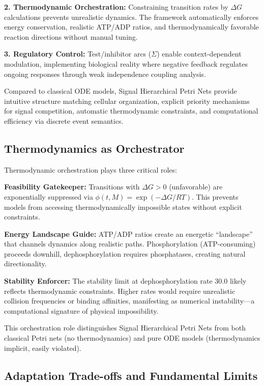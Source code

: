 \documentclass[twocolumn,11pt]{article}
\newcommand{\shpns}{Signal Hierarchical Petri Nets}
\newcommand{\dg}{\Delta G}
\begin{document}
\textbf{2. Thermodynamic Orchestration:} Constraining transition rates by $\dg{}$ calculations prevents unrealistic dynamics. The framework automatically enforces energy conservation, realistic ATP/ADP ratios, and thermodynamically favorable reaction directions without manual tuning.

\textbf{3. Regulatory Control:} Test/inhibitor arcs ($\Sigma$) enable context-dependent modulation, implementing biological reality where negative feedback regulates ongoing responses through weak independence coupling analysis.

Compared to classical ODE models, \shpns{} provide intuitive structure matching cellular organization, explicit priority mechanisms for signal competition, automatic thermodynamic constraints, and computational efficiency via discrete event semantics.

\subsection{Thermodynamics as Orchestrator}

Thermodynamic orchestration plays three critical roles:

\textbf{Feasibility Gatekeeper:} Transitions with $\dg{} > 0$ (unfavorable) are exponentially suppressed via $\phi(t,M) = \exp(-\dg{}/RT)$. This prevents models from accessing thermodynamically impossible states without explicit constraints.

\textbf{Energy Landscape Guide:} ATP/ADP ratios create an energetic ``landscape'' that channels dynamics along realistic paths. Phosphorylation (ATP-consuming) proceeds downhill, dephosphorylation requires phosphatases, creating natural directionality.

\textbf{Stability Enforcer:} The stability limit at dephosphorylation rate 30.0 likely reflects thermodynamic constraints. Higher rates would require unrealistic collision frequencies or binding affinities, manifesting as numerical instability---a computational signature of physical impossibility.

This orchestration role distinguishes \shpns{} from both classical Petri nets (no thermodynamics) and pure ODE models (thermodynamics implicit, easily violated).

\subsection{Adaptation Trade-offs and Fundamental Limits}
\label{sec:discussion-tradeoffs}
\end{document}
